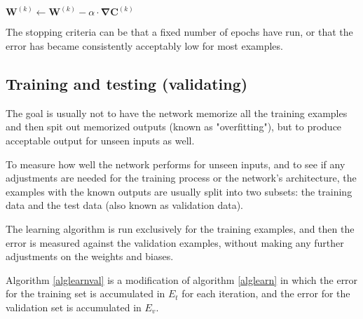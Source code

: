 \documentclass[titlepage]{article}
\begin{document}
      \begin{algorithm}
        \caption{%
          Algorithm \ref{algadjustweights} with matrix-vector notation.
        } \label{algadjustweightsvec}
        \begin{algorithmic}
              \State $
                \mathbf{W}^{(k)} \gets
                  \mathbf{W}^{(k)} - \alpha \cdot \mathbf{\nabla C}^{(k)}
              $
            \EndFor
          \EndProcedure
        \end{algorithmic}
      \end{algorithm}

      The stopping criteria can be that a fixed number of epochs have run, or
      that the error has became consistently acceptably low for most examples.

\newpage

    \subsection{Training and testing (validating)}

      The goal is usually not to have the network memorize all the training
      examples and then spit out memorized outputs (known as "overfitting"),
      but to produce acceptable output for unseen inputs as well.

      To measure how well the network performs for unseen inputs, and to see if
      any adjustments are needed for the training process or the network's
      architecture, the examples with the known outputs are usually split into
      two subsets: the training data and the test data (also known as
      validation data).

      The learning algorithm is run exclusively for the training examples, and
      then the error is measured against the validation examples, without
      making any further adjustments on the weights and biases.

      Algorithm \ref{alglearnval} is a modification of algorithm \ref{alglearn}
      in which the error for the training set is accumulated in $E_t$ for each
      iteration, and the error for the validation set is accumulated in $E_v$.
\end{document}
